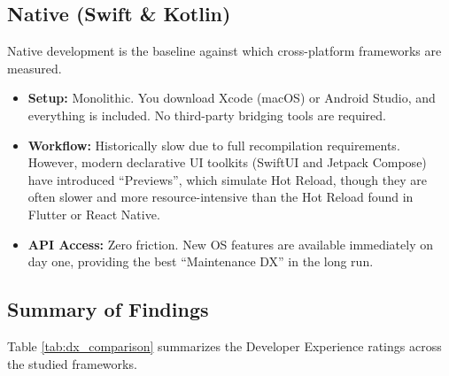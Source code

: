 \subsection{Native (Swift \& Kotlin)}
Native development is the baseline against which cross-platform frameworks are measured.
\begin{itemize}
    \item \textbf{Setup:} Monolithic. You download Xcode (macOS) or Android Studio, and everything is included. No third-party bridging tools are required.
    \item \textbf{Workflow:} Historically slow due to full recompilation requirements. However, modern declarative UI toolkits (SwiftUI and Jetpack Compose) have introduced ``Previews'', which simulate Hot Reload, though they are often slower and more resource-intensive than the Hot Reload found in Flutter or React Native.
    \item \textbf{API Access:} Zero friction. New OS features are available immediately on day one, providing the best ``Maintenance DX'' in the long run.
\end{itemize}

\subsection{Summary of Findings}
Table \ref{tab:dx_comparison} summarizes the Developer Experience ratings across the studied frameworks.


